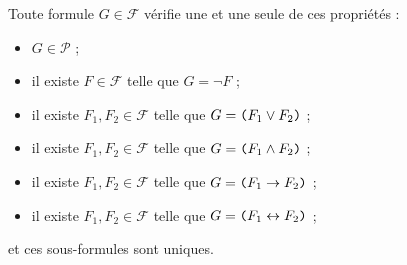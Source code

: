 \documentclass[./main]{subfiles}
\begin{document}
  \begingroup
  \def\thethm{\ref{lem:lecture-unique}}
  \begin{thm}
    Toute formule $G \in \mathcal{F}$ vérifie une et une seule de ces propriétés :
    \begin{itemize}
      \item $G \in \mathcal{P}$ ;
      \item il existe $F \in \mathcal{F}$ telle que $G = \lnot F$ ;
      \item il existe $F_1, F_2 \in \mathcal{F}$ telle que $G = \verb|(| F_1 \lor F_2 \verb|)|$ ;
      \item il existe $F_1, F_2 \in \mathcal{F}$ telle que $G = \verb|(| F_1 \land F_2 \verb|)|$ ;
      \item il existe $F_1, F_2 \in \mathcal{F}$ telle que $G = \verb|(| F_1 \to F_2 \verb|)|$ ;
      \item il existe $F_1, F_2 \in \mathcal{F}$ telle que $G = \verb|(| F_1 \leftrightarrow F_2 \verb|)|$ ;
    \end{itemize}
    et ces sous-formules sont uniques.
  \end{thm}
  \addtocounter{thm}{-1}
  \endgroup
\end{document}
